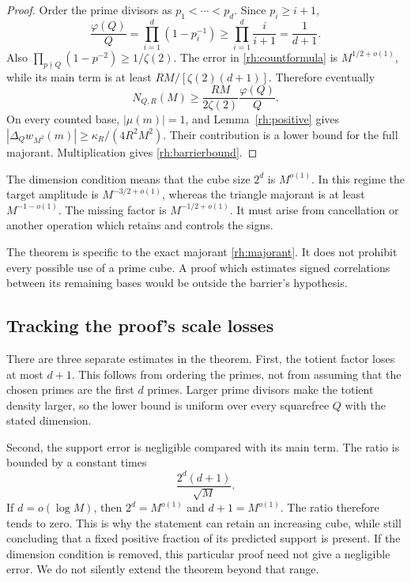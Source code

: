 \begin{proof}
Order the prime divisors as \(p_1<\cdots<p_d\). Since \(p_i\ge i+1\),
\[
\frac{\varphi(Q)}Q=\prod_{i=1}^d(1-p_i^{-1})
\ge\prod_{i=1}^d\frac i{i+1}=\frac1{d+1}.
\]
Also \(\prod_{p\nmid Q}(1-p^{-2})\ge1/\zeta(2)\).
The error in \eqref{rh:countformula} is \(M^{1/2+o(1)}\), while its main term is at least \(RM/[\zeta(2)(d+1)]\). Therefore eventually
\[
N_{Q,R}(M)\ge\frac{RM}{2\zeta(2)}\frac{\varphi(Q)}Q.
\]
On every counted base, \(|\mu(m)|=1\), and Lemma~\ref{rh:positive} gives
\(|\Delta_Qw_{M^2}(m)|\ge\kappa_R/(4R^2M^2)\).
Their contribution is a lower bound for the full majorant. Multiplication gives \eqref{rh:barrierbound}.
\end{proof}

The dimension condition means that the cube size \(2^d\) is \(M^{o(1)}\). In this regime the target amplitude is \(M^{-3/2+o(1)}\), whereas the triangle majorant is at least \(M^{-1-o(1)}\). The missing factor is \(M^{-1/2+o(1)}\). It must arise from cancellation or another operation which retains and controls the signs.

The theorem is specific to the exact majorant \eqref{rh:majorant}. It does not prohibit every possible use of a prime cube. A proof which estimates signed correlations between its remaining bases would be outside the barrier's hypothesis.

\subsection{Tracking the proof's scale losses}

There are three separate estimates in the theorem. First, the totient factor loses at most \(d+1\). This follows from ordering the primes, not from assuming that the chosen primes are the first \(d\) primes. Larger prime divisors make the totient density larger, so the lower bound is uniform over every squarefree \(Q\) with the stated dimension.

Second, the support error is negligible compared with its main term. The ratio is bounded by a constant times
\[
\frac{2^d(d+1)}{\sqrt M}.
\]
If \(d=o(\log M)\), then \(2^d=M^{o(1)}\) and \(d+1=M^{o(1)}\). The ratio therefore tends to zero. This is why the statement can retain an increasing cube, while still concluding that a fixed positive fraction of its predicted support is present. If the dimension condition is removed, this particular proof need not give a negligible error. We do not silently extend the theorem beyond that range.

